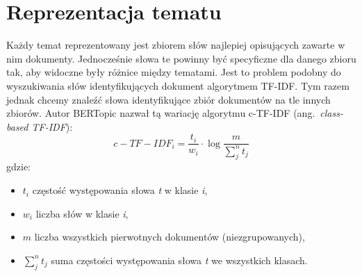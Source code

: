 \section{Reprezentacja tematu}
	Każdy temat reprezentowany jest zbiorem słów najlepiej opisujących zawarte w nim dokumenty.
	Jednocześnie słowa te powinny być specyficzne dla danego zbioru tak, aby widoczne były różnice między tematami.
	Jest to problem podobny do wyszukiwania słów identyfikujących dokument algorytmem TF-IDF\@.
	Tym razem jednak chcemy znaleźć słowa identyfikujące zbiór dokumentów na tle innych zbiorów.
	Autor BERTopic nazwał tą wariację algorytmu c-TF-IDF (ang.\ \emph{class-based TF-IDF}):
	\[c-TF-IDF_i = \frac{t_i}{w_i} \cdot \log \frac{m}{\sum_j^n t_j} \]
	gdzie:
	\begin{itemize}
		\item \(t_i\) częstość występowania słowa \emph{t} w klasie \emph{i},
		\item \(w_i\) liczba słów w klasie \emph{i},
		\item \(m\) liczba wszystkich pierwotnych dokumentów (niezgrupowanych),
		\item \(\sum_j^n t_j\) suma częstości występowania słowa \emph{t} we wszystkich klasach.
	\end{itemize}

